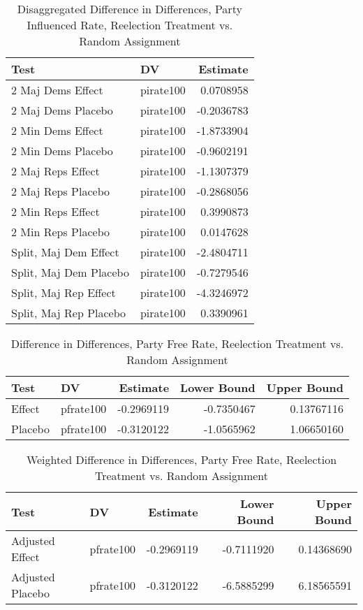 \documentclass[12pt]{article}
\begin{document}
\begin{table}[H]
	\centering
	\caption{Disaggregated Difference in Differences, Party Influenced Rate, Reelection Treatment vs. Random Assignment}
	\begin{tabular}{llr}
		\hline
		Test & DV & Estimate \\ 
		\hline
		2 Maj Dems Effect & pirate100 & 0.0708958 \\ 
		2 Maj Dems Placebo & pirate100 & -0.2036783 \\ 
		2 Min Dems Effect & pirate100 & -1.8733904 \\ 
		2 Min Dems Placebo & pirate100 & -0.9602191 \\ 
		2 Maj Reps Effect & pirate100 & -1.1307379 \\ 
		2 Maj Reps Placebo & pirate100 & -0.2868056 \\ 
		2 Min Reps Effect & pirate100 & 0.3990873 \\ 
		2 Min Reps Placebo & pirate100 & 0.0147628 \\ 
		Split, Maj Dem Effect & pirate100 & -2.4804711 \\ 
		Split, Maj Dem Placebo & pirate100 & -0.7279546 \\ 
		Split, Maj Rep Effect & pirate100 & -4.3246972 \\ 
		Split, Maj Rep Placebo & pirate100 & 0.3390961 \\ 
		\hline
	\end{tabular}
\end{table}

\pagebreak

\begin{table}[H]
	\centering
	\caption{Difference in Differences, Party Free Rate, Reelection Treatment vs. Random Assignment}
	\begin{tabular}{llrrr}
		\hline
		Test & DV & Estimate & Lower Bound & Upper Bound \\ 
		\hline
		Effect & pfrate100 & -0.2969119 & -0.7350467 & 0.13767116 \\ 
		Placebo & pfrate100 & -0.3120122 & -1.0565962 & 1.06650160 \\  
		\hline
	\end{tabular}
\end{table}

\begin{table}[H]
	\centering
	\caption{Weighted Difference in Differences, Party Free Rate, Reelection Treatment vs. Random Assignment}
	\begin{tabular}{llrrr}
		\hline
		Test & DV & Estimate & Lower Bound & Upper Bound \\ 
		\hline
		Adjusted Effect & pfrate100 & -0.2969119 & -0.7111920 & 0.14368690 \\ 
		Adjusted Placebo & pfrate100 & -0.3120122 & -6.5885299 & 6.18565591 \\  
		\hline
	\end{tabular}
\end{table}
\end{document}
